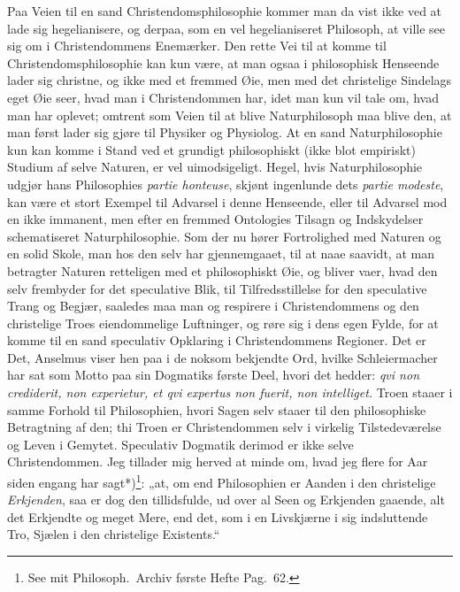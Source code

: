 \documentclass[12pt,a4paper]{book}
\newcommand{\apage}[1]{\marginnote{\footnotesize\textit{[#1]}}}
\begin{document}
Paa Veien til en sand Christendomsphilosophie kommer man da vist ikke ved at
lade sig hegelianisere, og derpaa, som en vel hegelianiseret Philosoph, at
ville see sig om i Christendommens Enemærker. Den rette Vei til at komme til
Christendomsphilosophie kan kun være, at man ogsaa i philosophisk Henseende
lader sig christne, og ikke med et fremmed Øie, men med det christelige
Sindelags eget Øie seer, hvad man i Christendommen har, idet man kun vil
tale om, hvad man har oplevet; omtrent som Veien til at blive Naturphilosoph
maa blive den, at man først lader sig gjøre til Physiker og Physiolog. At en
sand Naturphilosophie kun kan komme i Stand ved et grundigt philosophiskt
(ikke blot empiriskt) Studium af selve Naturen, er vel uimodsigeligt. Hegel,
hvis Naturphilosophie udgjør hans Philosophies \textit{partie honteuse},
skjønt ingenlunde dets \textit{partie modeste}, kan være et stort Exempel
til Advarsel i denne Henseende, eller til Advarsel mod en ikke immanent, men
efter en fremmed Ontologies Tilsagn og Indskydelser schematiseret
Naturphilosophie. Som der nu hører Fortrolighed med Naturen og en solid
Skole, man hos den selv har gjennemgaaet, til at naae saavidt, at man
betragter Naturen retteligen med et philosophiskt Øie, og bliver vaer, hvad
den selv frembyder for det speculative Blik, til Tilfredsstillelse for \apage{29} den
speculative Trang og Begjær, saaledes maa man og respirere i Christendommens
og den christelige Troes eiendommelige Luftninger, og røre sig i dens egen
Fylde, for at komme til en sand speculativ Opklaring i Christendommens
Regioner. Det er Det, Anselmus viser hen paa i de noksom bekjendte Ord,
hvilke Schleiermacher har sat som Motto paa sin Dogmatiks første Deel, hvori
det hedder: \textit{qvi non crediderit, non experietur, et qvi expertus non
fuerit, non intelliget.} Troen staaer i samme Forhold til Philosophien,
hvori Sagen selv staaer til den philosophiske Betragtning af den; thi Troen
er Christendommen selv i virkelig Tilstedeværelse og Leven i Gemytet.
Speculativ Dogmatik derimod er ikke selve Christendommen. Jeg tillader mig
herved at minde om, hvad jeg flere for Aar siden engang har
sagt*)\footnote{See mit Philosoph.\ Archiv første Hefte Pag.\ 62.}: „at, om
end Philosophien er Aanden i den christelige \emph{Erkjenden}, saa er dog den
tillidsfulde, ud over al Seen og Erkjenden gaaende, alt det Erkjendte og
meget Mere, end det, som i en Livskjærne i sig indsluttende Tro, Sjælen i den
christelige Existents.“
\end{document}
